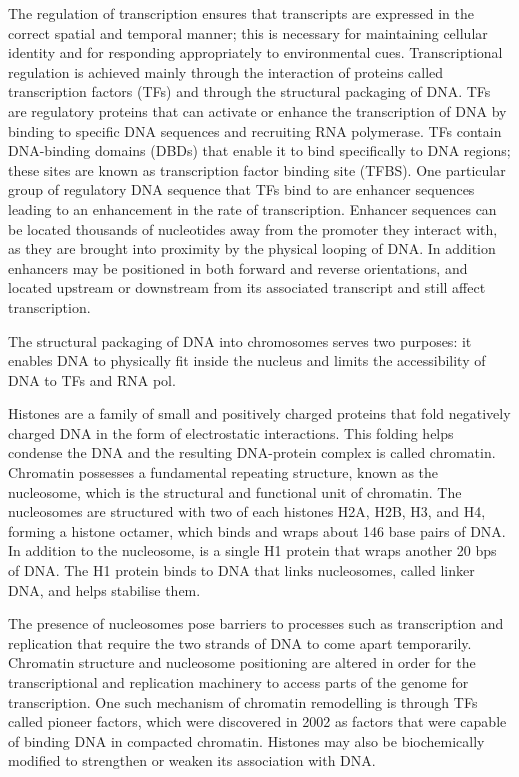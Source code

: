 The regulation of transcription ensures that transcripts are expressed in the correct spatial and temporal manner; this is necessary for maintaining cellular identity and for responding appropriately to environmental cues. Transcriptional regulation is achieved mainly through the interaction of proteins called transcription factors (TFs) and through the structural packaging of DNA. TFs are regulatory proteins that can activate or enhance the transcription of DNA by binding to specific DNA sequences and recruiting RNA polymerase\cite{pmid11092823}. TFs contain DNA-binding domains (DBDs) that enable it to bind specifically to DNA regions; these sites are known as transcription factor binding site (TFBS). One particular group of regulatory DNA sequence that TFs bind to are enhancer sequences leading to an enhancement in the rate of transcription. Enhancer sequences can be located thousands of nucleotides away from the promoter they interact with, as they are brought into proximity by the physical looping of DNA. In addition enhancers may be positioned in both forward and reverse orientations, and located upstream or downstream from its associated transcript and still affect transcription.

The structural packaging of DNA into chromosomes serves two purposes: it enables DNA to physically fit inside the nucleus and limits the accessibility of DNA to TFs and RNA pol.

Histones are a family of small and positively charged proteins that fold negatively charged DNA in the form of electrostatic interactions. This folding helps condense the DNA and the resulting DNA-protein complex is called chromatin. Chromatin possesses a fundamental repeating structure\cite{holde01111974}, known as the nucleosome, which is the structural and functional unit of chromatin. The nucleosomes are structured with two of each histones H2A, H2B, H3, and H4, forming a histone octamer, which binds and wraps about 146 base pairs of DNA. In addition to the nucleosome, is a single H1 protein that wraps another 20 bps of DNA. The H1 protein binds to DNA that links nucleosomes, called linker DNA, and helps stabilise them.

The presence of nucleosomes pose barriers to processes such as transcription and replication that require the two strands of DNA to come apart temporarily. Chromatin structure and nucleosome positioning are altered in order for the transcriptional and replication machinery to access parts of the genome for transcription. One such mechanism of chromatin remodelling is through TFs called pioneer factors, which were discovered in 2002 as factors that were capable of binding DNA in compacted chromatin\cite{pmid11864602}. Histones may also be biochemically modified to strengthen or weaken its association with DNA.

